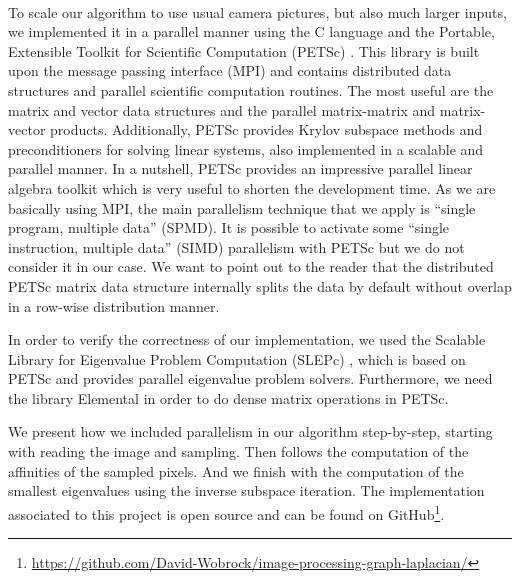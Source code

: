 \paragraph{}
To scale our algorithm to use usual camera pictures, but also much larger inputs, we implemented it in a parallel manner using the C language and the Portable, Extensible Toolkit for Scientific Computation (PETSc) \cite{petsc_web_page}.
This library is built upon the message passing interface (MPI) and contains distributed data structures and parallel scientific computation routines.
\ifthesis
 The most useful are the matrix and vector data structures and the parallel matrix-matrix and matrix-vector products.
 Additionally, PETSc provides Krylov subspace methods and preconditioners for solving linear systems, also implemented in a scalable and parallel manner.
\fi
In a nutshell, PETSc provides an impressive parallel linear algebra toolkit which is very useful to shorten the development time.
\ifthesis
 As we are basically using MPI, the main parallelism technique that we apply is ``single program, multiple data'' (SPMD).
 It is possible to activate some ``single instruction, multiple data'' (SIMD) parallelism with PETSc but we do not consider it in our case.
 We want to point out to the reader that the distributed PETSc matrix data structure internally splits the data by default without overlap in a row-wise distribution manner.
\fi

In order to verify the correctness of our implementation, we used the Scalable Library for Eigenvalue Problem Computation (SLEPc) \cite{hernandez_slepc_2005}, which is based on PETSc and provides parallel eigenvalue problem solvers.
Furthermore, we need the library Elemental \cite{poulson_elemental_2013} in order to do dense matrix operations in PETSc.

\ifthesis
 We present how we included parallelism in our algorithm step-by-step, starting with reading the image and sampling.
 Then follows the computation of the affinities of the sampled pixels.
 And we finish with the computation of the smallest eigenvalues using the inverse subspace iteration.
\fi
The implementation associated to this project is open source and can be found on GitHub\footnote{\url{https://github.com/David-Wobrock/image-processing-graph-laplacian/}}.
